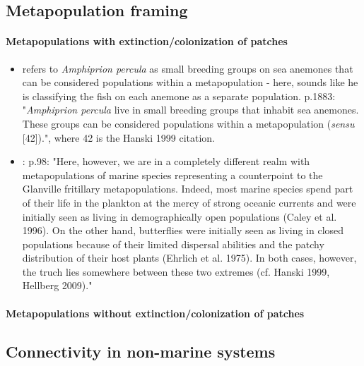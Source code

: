 \documentclass[12pt, oneside]{article}   	%
\begin{document}
\subsection*{Metapopulation framing}
\paragraph*{Metapopulations with extinction/colonization of patches}
\begin{itemize}
\item \cite{buston2011probability} refers to \textit{Amphiprion percula} as small breeding groups on sea anemones that can be considered populations within a metapopulation - here, sounds like he is classifying the fish on each anemone as a separate population. p.1883: "\textit{Amphiprion percula} live in small breeding groups that inhabit sea anemones. These groups can be considered populations within a metapopulation (\textit{sensu} [42]).", where 42 is the Hanski 1999 citation.
\item \cite{gaggiotti2017metapopulations}: p.98: "Here, however, we are in a completely different realm with metapopulations of marine species representing a counterpoint to the Glanville fritillary metapopulations. Indeed, most marine species spend part of their life in the plankton at the mercy of strong oceanic currents and were initially seen as living in demographically open populations (Caley et al. 1996). On the other hand, butterflies were initially seen as living in closed populations because of their limited dispersal abilities and the patchy distribution of their host plants (Ehrlich et al. 1975). In both cases, however, the truch lies somewhere between these two extremes (cf. Hanski 1999, Hellberg 2009)."
\end{itemize}

\paragraph*{Metapopulations without extinction/colonization of patches}

\subsection*{Connectivity in non-marine systems}
\end{document}
